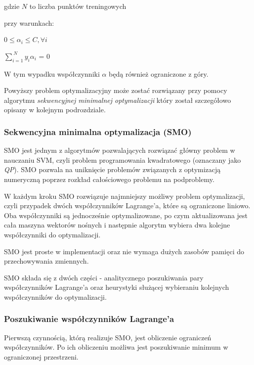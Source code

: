 \documentclass[[10pt,a4paper]{article}
\begin{document}
\vspace{5mm} gdzie $N$ to liczba punktów treningowych

\vspace{5mm} przy warunkach:

\vspace{5mm}\centerline {$0 \leq \alpha_i \leq C, \forall i$ }

\vspace{5mm}\centerline {$\sum_{i=1}^{\ N} y_i \alpha_i$ = 0 }

\vspace{5mm} W tym wypadku współczynniki $\alpha$ będą również ograniczone z góry. 

\vspace{5mm} Powyższy problem optymalizacyjny może zostać rozwiązany przy pomocy algorytmu \textit{sekwencyjnej minimalnej optymalizacji} który został szczegółowo opisany w kolejnym podrozdziale. 

\newpage
\subsubsection{Sekwencyjna minimalna optymalizacja (SMO)}
SMO jest jednym z algorytmów pozwalających rozwiązać główny problem w nauczaniu SVM, czyli problem programowania kwadratowego (oznaczany jako \textit{QP}). SMO pozwala na uniknięcie problemów związanych z optymizacją numeryczną poprzez rozkład  całościowego problemu na podproblemy.


W każdym kroku SMO rozwiązuje najmniejszy możliwy problem optymalizacji, czyli przypadek dwóch współczynników Lagrange'a, które są ograniczone liniowo. Oba współczynniki są jednocześnie optymalizowane, po czym aktualizowana jest cała maszyna wektorów nośnych i następnie algorytm wybiera dwa kolejne współczynniki do optymalizacji.


SMO jest proste w implementacji oraz nie wymaga dużych zasobów pamięci do przechowywania zmiennych.


SMO składa się z dwóch części - analitycznego poszukiwania pary współczynników Lagrange'a oraz heurystyki służącej wybieraniu kolejnych współczynników do optymalizacji.

\subsubsection{Poszukiwanie współczynników Lagrange'a}

Pierwszą czynnością, którą realizuje SMO, jest obliczenie ograniczeń współczynników. Po ich obliczeniu możliwa jest poszukiwanie minimum w ograniczonej przestrzeni. 
\end{document}
